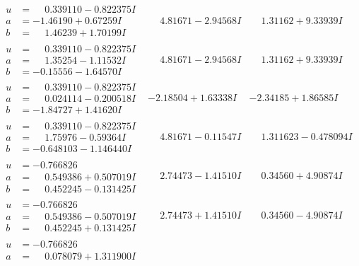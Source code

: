 \documentclass[1p]{elsarticle_modified}
\theoremstyle{definition}
\begin{document}
$$\begin{array}{c|c|c}
\begin{aligned}
u &= \phantom{-}0.339110 - 0.822375 I \\
a &= -1.46190 + 0.67259 I \\
b &= \phantom{-}1.46239 + 1.70199 I\end{aligned}
 & \phantom{-}4.81671 - 2.94568 I & \phantom{-}1.31162 + 9.33939 I \\ \hline\begin{aligned}
u &= \phantom{-}0.339110 - 0.822375 I \\
a &= \phantom{-}1.35254 - 1.11532 I \\
b &= -0.15556 - 1.64570 I\end{aligned}
 & \phantom{-}4.81671 - 2.94568 I & \phantom{-}1.31162 + 9.33939 I \\ \hline\begin{aligned}
u &= \phantom{-}0.339110 - 0.822375 I \\
a &= \phantom{-}0.024114 - 0.200518 I \\
b &= -1.84727 + 1.41620 I\end{aligned}
 & -2.18504 + 1.63338 I & -2.34185 + 1.86585 I \\ \hline\begin{aligned}
u &= \phantom{-}0.339110 - 0.822375 I \\
a &= \phantom{-}1.75976 - 0.59364 I \\
b &= -0.648103 - 1.146440 I\end{aligned}
 & \phantom{-}4.81671 - 0.11547 I & \phantom{-}1.311623 - 0.478094 I \\ \hline\begin{aligned}
u &= -0.766826\phantom{ +0.000000I} \\
a &= \phantom{-}0.549386 + 0.507019 I \\
b &= \phantom{-}0.452245 - 0.131425 I\end{aligned}
 & \phantom{-}2.74473 - 1.41510 I & \phantom{-}0.34560 + 4.90874 I \\ \hline\begin{aligned}
u &= -0.766826\phantom{ +0.000000I} \\
a &= \phantom{-}0.549386 - 0.507019 I \\
b &= \phantom{-}0.452245 + 0.131425 I\end{aligned}
 & \phantom{-}2.74473 + 1.41510 I & \phantom{-}0.34560 - 4.90874 I \\ \hline\begin{aligned}
u &= -0.766826\phantom{ +0.000000I} \\
a &= \phantom{-}0.078079 + 1.311900 I \\

\end{aligned}
\end{array}$$
\end{document}
